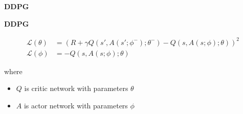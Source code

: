 \documentclass[xcolor=dvipsnames]{beamer}
\begin{document}
\begin{frame}{\bf DDPG}


\end{frame}


\begin{frame}{\bf DDPG}


  \begin{align*}
    \mathcal{L(\theta)} &= \left( R + \gamma Q(s', A(s'; \phi^-); \theta^-) - Q(s, A(s; \phi); \theta)  \right)^2 \\
    \mathcal{L(\phi)} &= -Q(s, A(s; \phi); \theta)
  \end{align*}

  where
  \begin{itemize}
    \item $Q$ is critic network with parameters $\theta$
    \item $A$ is actor network with parameters $\phi$
  \end{itemize}
  
\end{frame}
\end{document}
